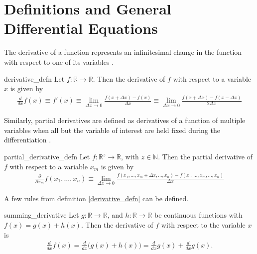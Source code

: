 
\section{Definitions and General Differential Equations}
 The derivative of a function represents an infinitesimal change in the function with respect to one of its variables \cite{bib:Wolfram}. 
\begin{defn}{derivative_defn} 
	Let $f:\mathbb{R}\rightarrow\mathbb{R}$. Then the derivative of $f$ with respect to a variable $x$ is given by
	\begin{align*}
	\frac{d}{dx}f(x)\equiv f'(x) \equiv\lim\limits_{\Delta x \rightarrow 0}\frac{f(x+\Delta x)-f(x)}{\Delta x} \equiv \lim\limits_{\Delta x \rightarrow 0}\frac{f(x+\Delta x)-f(x-\Delta x)}{2\Delta x}
	\end{align*}
\end{defn}
Similarly, partial derivatives are defined as derivatives of a function of multiple variables when all but the variable of interest are held fixed during the differentiation \cite{bib:Wolfram}. 
\begin{defn}{partial_derivative_defn}
	Let $f:\mathbb{R}^z\rightarrow\mathbb{R}$, with $z \in \mathbb{N}$. Then the partial derivative of $f$ with respect to a variable $x_m$ is given by
	\begin{align*}
	\frac{\partial}{\partial x_m}f(x_1,\dots,x_n) \equiv \lim\limits_{\Delta x \rightarrow 0}\frac{f(x_1,\dots,x_m+\Delta x, \dots,x_n)-f(x_1,\dots,x_m,\dots,x_n)}{\Delta x}
	\end{align*}
\end{defn}
A few rules from definition \ref{derivative_defn} can be defined.
\begin{theo}{summing_derivative}
	Let $g:\mathbb{R}\rightarrow\mathbb{R}$, and $h:\mathbb{R}\rightarrow\mathbb{R}$ be continuous functions with $f(x)=g(x)+h(x)$. Then the derivative of $f$ with respect to the variable $x$ is 
	\begin{align*}
	\frac{d}{dx}f(x)=\frac{d}{dx}\big(g(x)+h(x)\big) = \frac{d}{dx}g(x)+\frac{d}{dx}g(x).
	\end{align*} 
\end{theo}

